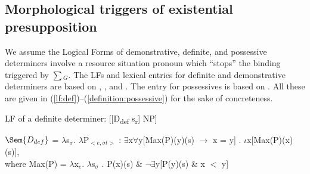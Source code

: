 \documentclass[output=paper,modfonts,nonflat]{langsci/langscibook}
\begin{document}
\subsection{Morphological triggers of existential presupposition}

We assume the Logical Forms of demonstrative, definite, and possessive determiners involve a resource situation pronoun which ``stops'' the binding triggered by $\sum$$_{G}$. The LFs and lexical entries for definite and demonstrative determiners are based on \citet{Heim:2011}, \citet{Elbourne:2008}, and \citet{Schwarz:2009}. The entry for possessives is based on \cite{SimonenkoCarlier:2019}. All these are given in (\ref{lf:def})--(\ref{definition:possessive}) for the sake of concreteness.

\ea\label{lf:def} LF of a definite determiner:
[[D\textsubscript{def} s\textsubscript{r}] NP]\\
\z

\ea
$\Sem{D_{def}}$ =  $\lambda$s$_{\sigma}$. $\lambda$P$_{<e,\sigma t>}$ : $\exists$x$\forall$y[Max(P)(y)(s) $\rightarrow$ x = y] . $\iota$x[Max(P)(x)(s)],\\
where Max(P) = $\lambda$x$_{e}$. $\lambda$s$_{\sigma}$ . P(x)(s) \& $\neg\exists$y[P(y)(s) \& x $<$ y] \label{definition:definite} 
\z


\end{document}
